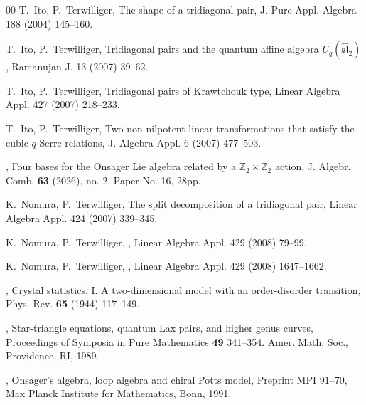\documentclass[11pt]{article}%
\theoremstyle{definition}
\theoremstyle{plain}
\begin{document}
\begin{thebibliography}{00}
	T.~Ito, P.~Terwilliger,
	\newblock The shape of a tridiagonal pair,
	\newblock J. Pure Appl. Algebra 188 (2004) 145--160.

 T.~Ito, P.~Terwilliger,
	\newblock Tridiagonal pairs and the quantum affine algebra
	$U_q(\widehat{\mathfrak{sl}}_2)$,
	\newblock Ramanujan J. 13 (2007) 39--62.

 T.~Ito, P.~Terwilliger,
	\newblock Tridiagonal pairs of Krawtchouk type,
	\newblock Linear Algebra Appl. 427 (2007) 218--233.

 T.~Ito, P.~Terwilliger,
	\newblock Two non-nilpotent linear transformations that satisfy
	the cubic $q$-Serre relations,
	\newblock J. Algebra Appl. 6 (2007) 477--503.


,
	\newblock Four bases for the Onsager Lie algebra related by a $\mathbb{Z}_2 \times \mathbb{Z}_2$ action.
	\newblock J. Algebr. Comb. \textbf{63} (2026), no. 2, Paper No. 16, 28pp.

	K.~Nomura, P.~Terwilliger,
	\newblock The split decomposition of a tridiagonal pair,
	\newblock Linear Algebra Appl. 424 (2007) 339--345.
	
	K.~Nomura, P.~Terwilliger,
	,
	\newblock Linear Algebra Appl. 429 (2008) 79--99.
	
	K.~Nomura, P.~Terwilliger,
	,
	\newblock Linear Algebra Appl. 429 (2008) 1647--1662.

, 
	Crystal statistics. I. A two-dimensional model with an order-disorder transition,
	Phys. Rev. \textbf{65} (1944) 117--149.

,
	Star-triangle equations, quantum Lax pairs, and higher genus curves, 
	Proceedings of Symposia in Pure Mathematics \textbf{49} 341--354. Amer. Math. Soc., Providence, RI, 1989.
	

,
	\newblock Onsager's algebra, loop algebra and chiral Potts model, 
	\newblock Preprint MPI 91--70, Max Planck Institute for Mathematics, Bonn, 1991.


\end{thebibliography}
\end{document}
